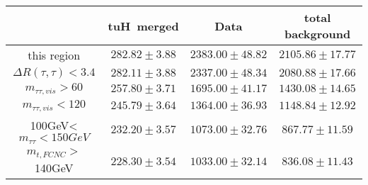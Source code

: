 \begin{tabular}{|c|c|c|c|} \hline
 & tuH~merged & Data & total background\\\hline
 this region & $282.82\pm3.88$ & $2383.00\pm48.82$ & $2105.86\pm17.77$\\\hline
$\Delta R(\tau,\tau)<3.4$ & $282.11\pm3.88$ & $2337.00\pm48.34$ & $2080.88\pm17.66$\\\hline
$m_{\tau\tau,vis}>60$ & $257.80\pm3.71$ & $1695.00\pm41.17$ & $1430.08\pm14.65$\\\hline
$m_{\tau\tau,vis}<120$ & $245.79\pm3.64$ & $1364.00\pm36.93$ & $1148.84\pm12.92$\\\hline
100GeV<$m_{\tau\tau}<150GeV$ & $232.20\pm3.57$ & $1073.00\pm32.76$ & $867.77\pm11.59$\\\hline
$m_{t,FCNC}>$140GeV & $228.30\pm3.54$ & $1033.00\pm32.14$ & $836.08\pm11.43$\\\hline
\end{tabular}
